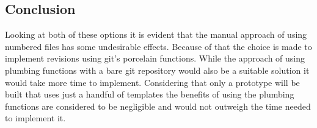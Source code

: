 %
%
%
%
%
%
%
%
%

\subsection{Conclusion}
Looking at both of these options it is evident that the manual approach of using numbered files has some undesirable effects.
Because of that the choice is made to implement revisions using git's porcelain functions.
While the approach of using plumbing functions with a bare git repository would also be a suitable solution it would take more time to implement.
Considering that only a prototype will be built that uses just a handful of templates the benefits of using the plumbing functions are considered to be negligible and would not outweigh the time needed to implement it.
